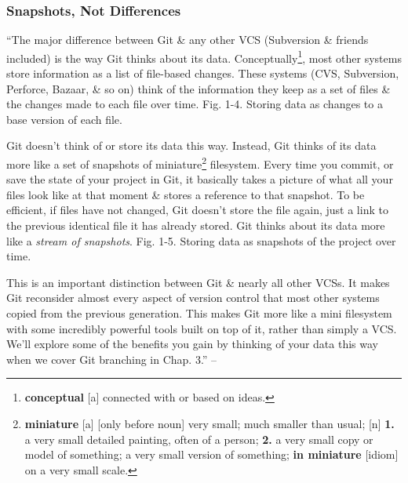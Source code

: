 \documentclass[oneside]{book}
\numberwithin{equation}{section}
\begin{document}
\subsubsection{Snapshots, Not Differences}
``The major difference between Git \& any other VCS (Subversion \& friends included) is the way Git thinks about its data. Conceptually\footnote{\textbf{conceptual} [a] connected with or based on ideas.}, most other systems store information as a list of file-based changes. These systems (CVS, Subversion, Perforce, Bazaar, \& so on) think of the information they keep as a set of files \& the changes made to each file over time. \textsf{Fig. 1-4. Storing data as changes to a base version of each file.}

Git doesn't think of or store its data this way. Instead, Git thinks of its data more like a set of snapshots of miniature\footnote{\textbf{miniature} [a] [only before noun] very small; much smaller than usual; [n] \textbf{1.} a very small detailed painting, often of a person; \textbf{2.} a very small copy or model of something; a very small version of something; \textbf{in miniature} [idiom] on a very small scale.} filesystem. Every time you commit, or save the state of your project in Git, it basically takes a picture of what all your files look like at that moment \& stores a reference to that snapshot. To be efficient, if files have not changed, Git doesn't store the file again, just a link to the previous identical file it has already stored. Git thinks about its data more like a \textit{stream of snapshots}. \textsf{Fig. 1-5. Storing data as snapshots of the project over time.}

This is an important distinction between Git \& nearly all other VCSs. It makes Git reconsider almost every aspect of version control that most other systems copied from the previous generation. This makes Git more like a mini filesystem with some incredibly powerful tools built on top of it, rather than simply a VCS. We'll explore some of the benefits you gain by thinking of your data this way when we cover Git branching in Chap. 3.'' -- \cite[pp. 6--7]{Chacon_Straub2014}
\end{document}
